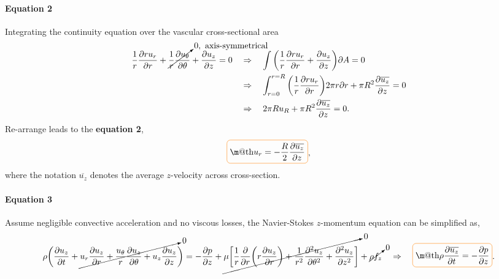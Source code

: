 \documentclass[a4paper]{article}
\makeatletter
\newcommand*{\boxcolor}{orange}
\renewcommand{\boxed}[1]{\textcolor{\boxcolor}{%
\tikz[baseline={([yshift=-1ex]current bounding box.center)}] \node [rectangle, minimum width=1ex,rounded corners,draw] {\normalcolor\m@th$\displaystyle#1$};}}
\makeatother
\begin{document}
\paragraph{Equation 2}
Integrating the continuity equation over the vascular cross-sectional area 
\begin{align*}
    \frac{1}{r}\frac{\partial ru_{r}}{\partial r} 
    + \cancelto{0, \ \text{axis-symmetrical}}{\frac{1}{r}\frac{\partial u_{\theta}}{\partial \theta}}
    + \frac{\partial u_{z}}{\partial z} = 0
    & \quad \Rightarrow \quad
    \int \bigg( \frac{1}{r}\frac{\partial ru_{r}}{\partial r} + \frac{\partial u_{z}}{\partial z} \bigg) \partial A = 0 \\
    & \quad \Rightarrow \quad
    \int_{r = 0}^{r = R} \bigg( \frac{1}{r}\frac{\partial ru_{r}}{\partial r}\bigg) 2\pi r \partial r + \pi R^2 \frac{\partial \overline{u_{z}}}{\partial z} = 0 \\
    & \quad \Rightarrow \quad
    2 \pi R u_R + \pi R^2 \frac{\partial \overline{u_z}}{\partial z} = 0 .
\end{align*}
Re-arrange leads to the \textbf{equation 2},
\[
\boxed{
    u_r = -\frac{R}{2} \frac{\partial \overline{u_z}}{\partial z}
},
\]
where the notation $\overline{u_z}$ denotes the average $z$-velocity across cross-section.

\paragraph{Equation 3} Assume negligible convective acceleration and no viscous losses, the Navier-Stokes $z$-momentum equation can be simplified as,
\[
    \rho \bigg(\frac{\partial u_{z}}{\partial t} + \cancelto{0}{u_{r} \frac{\partial u_{z}}{\partial r} + \frac{u_{\theta}}{r}\frac{\partial u_{z}}{\partial \theta} + u_{z}\frac{\partial u_{z}}{\partial z}} \bigg) = -\frac{\partial p}{\partial z} + \cancelto{0}{\mu \bigg[ \frac{1}{r}\frac{\partial}{\partial r} \bigg(r \frac{\partial u_{z}}{\partial r}\bigg) + \frac{1}{r^{2}} \frac{\partial^{2} u_{z}}{\partial \theta^{2}} + \frac{\partial^{2} u_{z}}{\partial z^{2}} \bigg]} + \cancelto{0}{\rho f_{z}}
    \quad \Rightarrow \quad 
    \boxed{
    \rho \frac{\partial\overline{u_{z}}}{\partial t} = -\frac{\partial p}{\partial z}
    }.
\]
\end{document}
